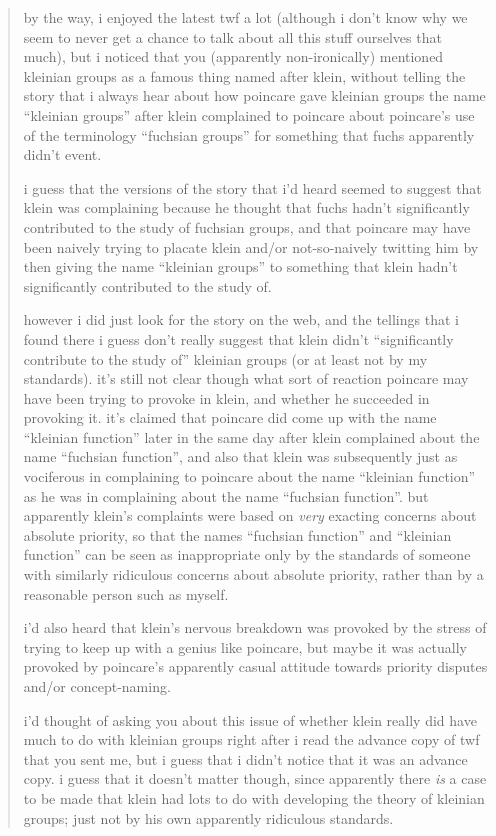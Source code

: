 \documentclass{article}
\begin{document}
\begin{quote}
by the way, i enjoyed the latest twf a lot (although i don't know why we
seem to never get a chance to talk about all this stuff ourselves that
much), but i noticed that you (apparently non-ironically) mentioned
kleinian groups as a famous thing named after klein, without telling the
story that i always hear about how poincare gave kleinian groups the
name ``kleinian groups'' after klein complained to poincare about
poincare's use of the terminology ``fuchsian groups'' for something that
fuchs apparently didn't event.

i guess that the versions of the story that i'd heard seemed to suggest
that klein was complaining because he thought that fuchs hadn't
significantly contributed to the study of fuchsian groups, and that
poincare may have been naively trying to placate klein and/or
not-so-naively twitting him by then giving the name ``kleinian groups''
to something that klein hadn't significantly contributed to the study
of.

however i did just look for the story on the web, and the tellings that
i found there i guess don't really suggest that klein didn't
``significantly contribute to the study of'' kleinian groups (or at
least not by my standards). it's still not clear though what sort of
reaction poincare may have been trying to provoke in klein, and whether
he succeeded in provoking it. it's claimed that poincare did come up
with the name ``kleinian function'' later in the same day after klein
complained about the name ``fuchsian function'', and also that klein was
subsequently just as vociferous in complaining to poincare about the
name ``kleinian function'' as he was in complaining about the name
``fuchsian function''. but apparently klein's complaints were based on
\emph{very} exacting concerns about absolute priority, so that the names
``fuchsian function'' and ``kleinian function'' can be seen as
inappropriate only by the standards of someone with similarly ridiculous
concerns about absolute priority, rather than by a reasonable person
such as myself.

i'd also heard that klein's nervous breakdown was provoked by the stress
of trying to keep up with a genius like poincare, but maybe it was
actually provoked by poincare's apparently casual attitude towards
priority disputes and/or concept-naming.

i'd thought of asking you about this issue of whether klein really did
have much to do with kleinian groups right after i read the advance copy
of twf that you sent me, but i guess that i didn't notice that it was an
advance copy. i guess that it doesn't matter though, since apparently
there \emph{is} a case to be made that klein had lots to do with
developing the theory of kleinian groups; just not by his own apparently
ridiculous standards.
\end{quote}
\end{document}
